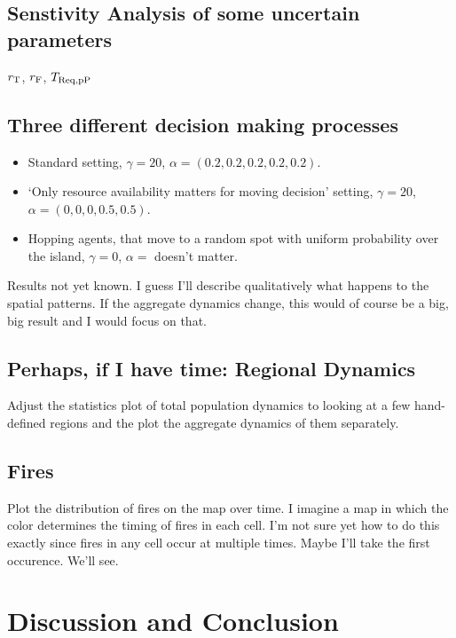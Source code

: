 \section{Senstivity Analysis of some uncertain parameters}
$r_{\rm T}$, $r_{\rm F}$,
$T_{\rm Req, pP}$

\section{Three different decision making processes}
\begin{itemize}
	\item Standard setting, $\gamma=20$, $\alpha=(0.2,0.2,0.2,0.2,0.2)$.
	\item `Only resource availability matters for moving decision' setting, $\gamma=20$, $\alpha=(0, 0, 0, 0.5,0.5)$.
	\item Hopping agents, that move to a random spot with uniform probability over the island, $\gamma=0$, $\alpha=$ doesn't matter.
\end{itemize}
Results not yet known. I guess I'll describe qualitatively what happens to the spatial patterns. 
If the aggregate dynamics change, this would of course be a big, big result and I would focus on that.


\section{Perhaps, if I have time: Regional Dynamics}
Adjust the statistics plot of total population dynamics to looking at a few hand-defined regions and the plot the aggregate dynamics of them separately. 

\section{Fires}
Plot the distribution of fires on the map over time. 
I imagine a map in which the color determines the timing of fires in each cell. 
I'm not sure yet how to do this exactly since fires in any cell occur at multiple times. Maybe I'll take the first occurence. We'll see.



\chapter{Discussion and Conclusion}
